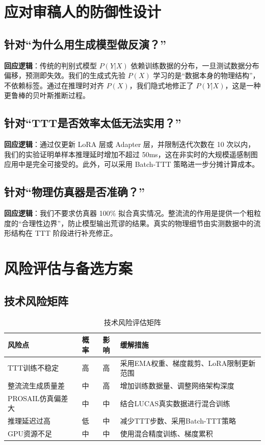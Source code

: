\documentclass[12pt, a4paper]{article}
\begin{document}
\newpage
\section{应对审稿人的防御性设计}

\subsection{针对“为什么用生成模型做反演？”}
\textbf{回应逻辑}：传统的判别式模型 $P(Y|X)$ 依赖训练数据的分布，一旦测试数据分布偏移，预测即失效。我们的生成式先验 $P(X)$ 学习的是“数据本身的物理结构”，不依赖标签。通过在推理时对齐 $P(X)$，我们隐式地修正了 $P(Y|X)$，这是一种更鲁棒的贝叶斯推断过程。

\subsection{针对“TTT是否效率太低无法实用？”}
\textbf{回应逻辑}：通过仅更新 LoRA 层或 Adapter 层，并限制迭代次数在 10 次以内，我们的实验证明单样本推理延时增加不超过 50ms，这在非实时的大规模遥感制图应用中是完全可接受的。此外，可以采用 Batch-TTT 策略进一步分摊计算成本。

\subsection{针对“物理仿真器是否准确？”}
\textbf{回应逻辑}：我们不要求仿真器 100\% 拟合真实情况。整流流的作用是提供一个粗粒度的“合理性边界”，防止模型输出荒谬的结果。真实的物理细节由实测数据中的流形结构在 TTT 阶段进行补充修正。

\newpage
\section{风险评估与备选方案}

\subsection{技术风险矩阵}

\begin{table}[H]
\centering
\caption{技术风险评估矩阵}
\begin{tabular}{lccl}
\toprule
风险点 & 概率 & 影响 & 缓解措施 \\
\midrule
TTT训练不稳定 & 高 & 高 & 采用EMA权重、梯度裁剪、LoRA限制更新范围 \\
整流流生成质量差 & 中 & 高 & 增加训练数据量、调整网络架构深度 \\
PROSAIL仿真偏差大 & 中 & 中 & 结合LUCAS真实数据进行混合训练 \\
推理延迟过高 & 低 & 中 & 减少TTT步数、采用Batch-TTT策略 \\
GPU资源不足 & 中 & 中 & 使用混合精度训练、梯度累积 \\
\bottomrule
\end{tabular}
\end{table}
\end{document}
